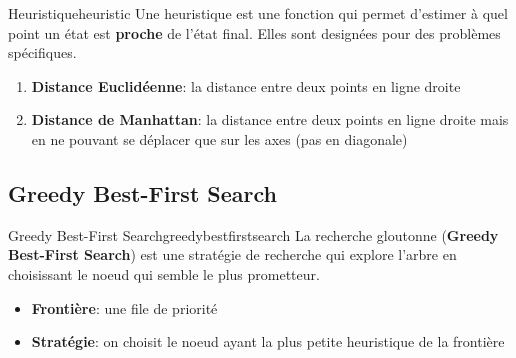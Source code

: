 \documentclass[a4paper, 12pt]{extarticle}
\begin{document}
\begin{definition}{Heuristique}{heuristic}
    Une heuristique est une fonction qui permet d'estimer à quel point un état est \textbf{proche}
    de l'état final. Elles sont designées pour des problèmes spécifiques.
\end{definition}

\begin{examples}\leavevmode
    \begin{enumerate}
        \item \textbf{Distance Euclidéenne}: la distance entre deux points 
            en ligne droite 
        \item \textbf{Distance de Manhattan}: la distance entre deux points 
            en ligne droite mais en ne pouvant se déplacer que sur les axes 
            (pas en diagonale) 
    \end{enumerate}
\end{examples}


\subsection{Greedy Best-First Search} %
\label{sub:greedy_best_first_search}

\begin{definition}{Greedy Best-First Search}{greedybestfirstsearch}
    La recherche gloutonne (\textbf{Greedy Best-First Search}) est une stratégie de recherche qui explore l'arbre en choisissant le noeud qui semble le plus prometteur.
    \begin{itemize}
        \item \textbf{Frontière}: une file de priorité
        \item \textbf{Stratégie}: on choisit le noeud ayant la plus petite heuristique de la frontière
    \end{itemize} 
\end{definition}
\end{document}
